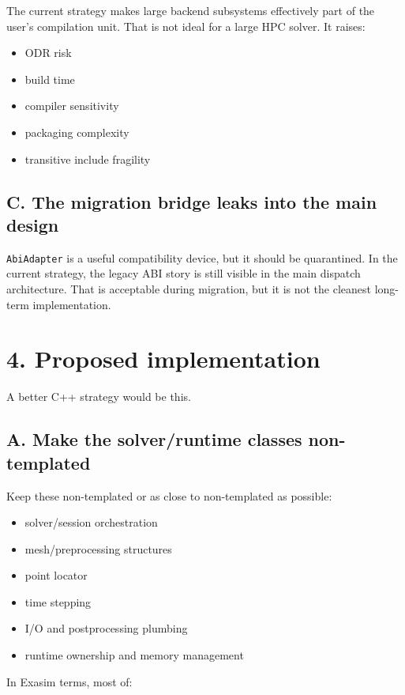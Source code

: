 \documentclass[11pt]{article}
\begin{document}
The current strategy makes large backend subsystems effectively part of the user's compilation unit. That is not ideal for a large HPC solver. It raises:

\begin{itemize}[leftmargin=*]
\item ODR risk
\item build time
\item compiler sensitivity
\item packaging complexity
\item transitive include fragility
\end{itemize}

\subsection*{C. The migration bridge leaks into the main design}

\texttt{AbiAdapter} is a useful compatibility device, but it should be quarantined. In the current strategy, the legacy ABI story is still visible in the main dispatch architecture. That is acceptable during migration, but it is not the cleanest long-term implementation.

\section*{4. Proposed implementation}

A better C++ strategy would be this.

\subsection*{A. Make the solver/runtime classes non-templated}

Keep these non-templated or as close to non-templated as possible:

\begin{itemize}[leftmargin=*]
\item solver/session orchestration
\item mesh/preprocessing structures
\item point locator
\item time stepping
\item I/O and postprocessing plumbing
\item runtime ownership and memory management
\end{itemize}

In Exasim terms, most of:
\end{document}
